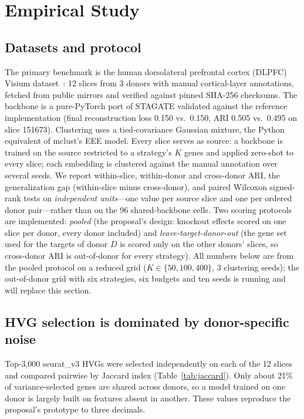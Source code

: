 \documentclass[11pt]{article}
\begin{document}
\section{Empirical Study}
\label{sec:results}

\subsection{Datasets and protocol}
The primary benchmark is the human dorsolateral prefrontal cortex (DLPFC) Visium
dataset~\citep{maynard2021}: 12 slices from 3 donors with manual cortical-layer
annotations, fetched from public mirrors and verified against pinned SHA-256
checksums. The backbone is a pure-PyTorch port of STAGATE validated against the
reference implementation (final reconstruction loss 0.150 vs.\ 0.150, ARI 0.505
vs.\ 0.495 on slice 151673). Clustering uses a tied-covariance Gaussian mixture,
the Python equivalent of mclust's EEE model. Every slice serves as source: a
backbone is trained on the source restricted to a strategy's $K$ genes and
applied zero-shot to every slice; each embedding is clustered against the manual
annotation over several seeds. We report within-slice, within-donor and
cross-donor ARI, the generalization gap (within-slice minus cross-donor), and
paired Wilcoxon signed-rank tests on \emph{independent units}---one value per
source slice and one per ordered donor pair---rather than on the 96 shared-backbone
cells. Two scoring protocols are implemented: \emph{pooled} (the proposal's
design: knockout effects scored on one slice per donor, every donor included)
and \emph{leave-target-donor-out} (the gene set used for the targets of donor $D$
is scored only on the other donors' slices, so cross-donor ARI is out-of-donor
for every strategy). All numbers below are from the pooled protocol on a reduced
grid ($K\in\{50,100,400\}$, 3 clustering seeds); the out-of-donor grid with six
strategies, six budgets and ten seeds is running and will replace this section.

\subsection{HVG selection is dominated by donor-specific noise}
Top-3{,}000 seurat\_v3 HVGs were selected independently on each of the 12
slices and compared pairwise by Jaccard index (Table~\ref{tab:jaccard}). Only
about 21\% of variance-selected genes are shared across donors, so a model
trained on one donor is largely built on features absent in another. These
values reproduce the proposal's prototype to three decimals.
\end{document}
